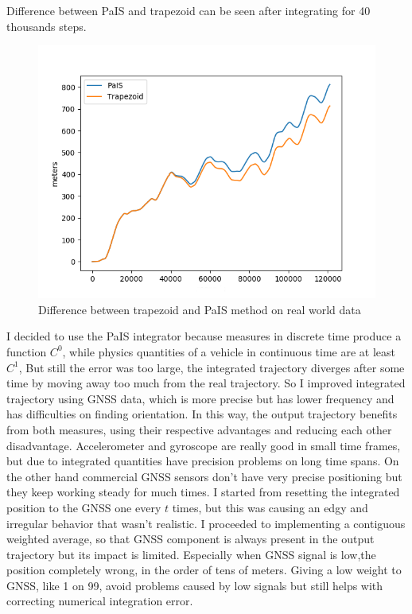 Difference between PaIS and trapezoid can be seen after integrating for 40 thousands steps.
\begin{figure}[H]
\centering
\includegraphics[scale=0.6]{trapezoid_vs_Pais_real_world.png}
\caption{Difference between trapezoid and PaIS method on real world data}
\end{figure}

\justify
I decided to use the PaIS integrator because measures in discrete time produce a function $C^0$, while physics quantities of a vehicle in continuous time are at least $C^1$, 
\justify
But still the error was too large, the integrated trajectory diverges after some time by moving away too much from the real trajectory.
So I improved integrated trajectory using GNSS data, which is more precise but has lower frequency and has difficulties on finding orientation. In this way, the output trajectory benefits from both measures, using their respective advantages and reducing each other disadvantage. Accelerometer and gyroscope are really good in small time frames, but due to integrated quantities have precision problems on long time spans. On the other hand commercial GNSS sensors don't have very precise positioning but they keep working steady for much times.
I started from resetting the integrated position to the GNSS one every $t$ times, but this was causing an edgy and irregular behavior that wasn't realistic.
I proceeded to implementing a contiguous weighted average, so that GNSS component is always present in the output trajectory but its impact is limited. Especially when GNSS signal is low,the position completely wrong, in the order of tens of meters. Giving a low weight to GNSS, like 1 on 99, avoid problems caused by low signals but still helps with correcting numerical integration error.

